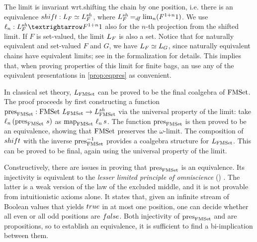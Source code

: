 \documentclass[final,a4paper,USenglish,cleveref]{lipics-v2021}
\begin{document}
The limit is invariant wrt.\@ shifting the chain by one position, i.e. there is an equivalence $\shift : \Lim{F} \simeq \LimSh{F}$, where $\LimSh{F} \DefEq \lim_{n} (F^{1 + n} 1)$. We use $\ell_n : \LimSh{F} → F^{1+n} 1$ also for the $n$-th projection from the shifted limit.
If $F$ is set-valued, the limit $\Lim{F}$ is also a set.
Notice that for naturally equivalent and set-valued $F$ and $G$, we have $\Lim{F} \simeq \Lim{G}$,
since naturally equivalent chains have equivalent limits;
see  in the formalization for details.
This implies that, when proving properties of this limit for finite bags, an use any of the equivalent presentations in \cref{prop:eqpres} as convenient.

In classical set theory, $\Lim{\FMSet}$ can be proved to be the final coalgebra of $\FMSet$. The proof proceeds by first constructing a function $\pres{\FMSet} : \FMSet \,\Lim{\FMSet} \to \LimSh{\FMSet}$ via the universal property of the limit: take $\ell_n\,(\pres{\FMSet} \,s)$ as $\Map{\FMSet}\,\ell_n \,s$. The function $\pres{\FMSet}$ is then proved to be an equivalence, showing that $\FMSet$ preserves the $\omega$-limit. The composition of $\shift$ with the inverse $\pres{\FMSet}^{-1}$ provides a coalgebra structure for $\Lim{\FMSet}$. This can be proved to be final, again using the universal property of the limit.

Constructively, there are issues in proving that $\pres{\FMSet}$ is an equivalence. Its injectivity is equivalent to the \emph{lesser limited principle of omniscience} (\LLPO{}) \cite[{Ch.\@ 1}]{Bridges1987}. The latter is a weak version of the law of the excluded middle, and it is not provable from intuitionistic axioms alone.  It states that, given an infinite stream of Boolean
values that yields $\True$ in at most one position, one can decide
whether all even or all odd positions are $\False$.
Both injectivity of $\pres{\FMSet}$ and \LLPO{} are propositions, so to establish an equivalence, it is sufficient to find a bi-implication between them.
\end{document}
